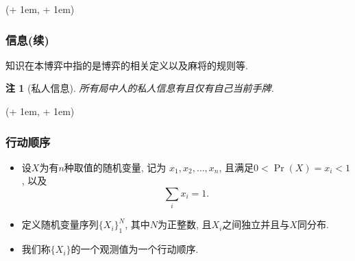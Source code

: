 \documentclass[xcolor=dvipsnames]{ctexbeamer}
\newcommand{\FrameTextCrono}[1]{
    \begin{textblock*}{\paperwidth}(\textwidth + 1em, \textheight + 1em)
        #1
    \end{textblock*}
}
\let\oldframe\frame
\let\oldendframe\endframe
\renewenvironment{frame}
    {\oldframe\FrameTextCrono{\small\color{blue}{\crono}}}
    {\oldendframe}
\newtheorem{note}{注}[section]
\begin{document}
    \begin{frame}
        \frametitle{信息(续)}
        \begin{definition}[知识]
            知识在本博弈中指的是博弈的相关定义以及麻将的规则等.
        \end{definition}
        \begin{note}[私人信息]
            所有局中人的私人信息有且仅有自己当前手牌.
        \end{note}
    \end{frame}
    
    \begin{frame}
        \frametitle{行动顺序}
        \begin{definition}[行动顺序]
            \begin{itemize}
                \item 设$X$为有$n$种取值的随机变量, 记为
                    $x_{1}, x_{2}, \dotsc, x_{n}$,
                    且满足$0<\Pr(X)=x_{i}<1$, 以及
                    \begin{equation}
                        \sum_{i}{x_{i}} = 1.
                    \end{equation}
                \item 定义随机变量序列$\{X_{i}\}_{1}^{N}$, 其中$N$为正整数,
                    且$X_{i}$之间独立并且与$X$同分布.
                \item 我们称$\{X_{i}\}$的一个观测值为一个行动顺序.
            \end{itemize}
        \end{definition}
    \end{frame}
\end{document}
